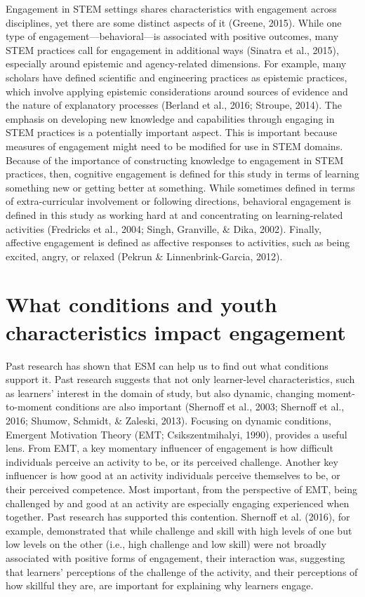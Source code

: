 \documentclass[]{msu-thesis}
\theoremstyle{definition}
\theoremstyle{definition}
\theoremstyle{definition}
\theoremstyle{remark}
\begin{document}
Engagement in STEM settings shares characteristics with engagement
across disciplines, yet there are some distinct aspects of it (Greene,
2015). While one type of engagement---behavioral---is associated with
positive outcomes, many STEM practices call for engagement in additional
ways (Sinatra et al., 2015), especially around epistemic and
agency-related dimensions. For example, many scholars have defined
scientific and engineering practices as epistemic practices, which
involve applying epistemic considerations around sources of evidence and
the nature of explanatory processes (Berland et al., 2016; Stroupe,
2014). The emphasis on developing new knowledge and capabilities through
engaging in STEM practices is a potentially important aspect. This is
important because measures of engagement might need to be modified for
use in STEM domains. Because of the importance of constructing knowledge
to engagement in STEM practices, then, cognitive engagement is defined
for this study in terms of learning something new or getting better at
something. While sometimes defined in terms of extra-curricular
involvement or following directions, behavioral engagement is defined in
this study as working hard at and concentrating on learning-related
activities (Fredricks et al., 2004; Singh, Granville, \& Dika, 2002).
Finally, affective engagement is defined as affective responses to
activities, such as being excited, angry, or relaxed (Pekrun \&
Linnenbrink-Garcia, 2012).

\section{What conditions and youth characteristics impact
engagement}\label{what-conditions-and-youth-characteristics-impact-engagement}

Past research has shown that ESM can help us to find out what conditions
support it. Past research suggests that not only learner-level
characteristics, such as learners' interest in the domain of study, but
also dynamic, changing moment-to-moment conditions are also important
(Shernoff et al., 2003; Shernoff et al., 2016; Shumow, Schmidt, \&
Zaleski, 2013). Focusing on dynamic conditions, Emergent Motivation
Theory (EMT; Csikszentmihalyi, 1990), provides a useful lens. From EMT,
a key momentary influencer of engagement is how difficult individuals
perceive an activity to be, or its perceived challenge. Another key
influencer is how good at an activity individuals perceive themselves to
be, or their perceived competence. Most important, from the perspective
of EMT, being challenged by and good at an activity are especially
engaging experienced when together. Past research has supported this
contention. Shernoff et al. (2016), for example, demonstrated that while
challenge and skill with high levels of one but low levels on the other
(i.e., high challenge and low skill) were not broadly associated with
positive forms of engagement, their interaction was, suggesting that
learners' perceptions of the challenge of the activity, and their
perceptions of how skillful they are, are important for explaining why
learners engage.
\end{document}
